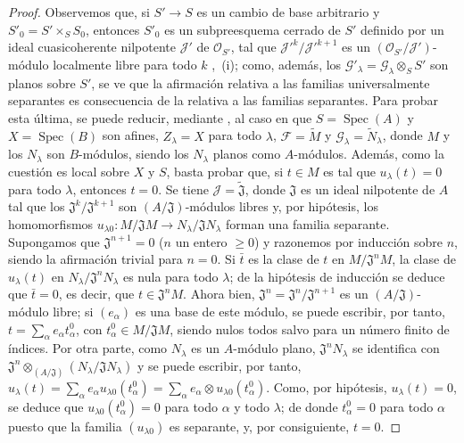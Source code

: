 \begin{proof}
Observemos que, si $S'\to S$ es un cambio de base arbitrario y $S'_0=S'\times_S S_0$, entonces $S'_0$ es un subpreesquema cerrado de $S'$ definido por un ideal cuasicoherente nilpotente $\mathcal J'$ de $\mathcal O_{S'}$, tal que $\mathcal J'^k/\mathcal J'^{k+1}$ es un $(\mathcal O_{S'}/\mathcal J')$-módulo localmente libre para todo $k$ ,~(i); como, además, los $\mathcal G'_\lambda=\mathcal G_\lambda\otimes_S S'$ son planos sobre $S'$, se ve que la afirmación relativa a las familias universalmente separantes es consecuencia de la relativa a las familias separantes.
Para probar esta última, se puede reducir, mediante , al caso en que $S=\operatorname{Spec}(A)$ y $X=\operatorname{Spec}(B)$ son afines, $Z_\lambda=X$ para todo $\lambda$, $\mathcal F=\widetilde M$ y $\mathcal G_\lambda=\widetilde N_\lambda$, donde $M$ y los $N_\lambda$ son $B$-módulos, siendo los $N_\lambda$ planos como $A$-módulos.
Además, como la cuestión es local sobre $X$ y $S$, basta probar que, si $t\in M$ es tal que $u_\lambda(t)=0$ para todo $\lambda$, entonces $t=0$.
Se tiene $\mathcal J=\widetilde{\mathfrak J}$, donde $\mathfrak J$ es un ideal nilpotente de $A$ tal que los $\mathfrak J^k/\mathfrak J^{k+1}$ son $(A/\mathfrak J)$-módulos libres y, por hipótesis, los homomorfismos $u_{\lambda0}:M/\mathfrak JM\to N_\lambda/\mathfrak JN_\lambda$ forman una familia separante.
Supongamos que $\mathfrak J^{n+1}=0$ ($n$ un entero $\geq0$) y razonemos por inducción sobre $n$, siendo la afirmación trivial para $n=0$.
Si $\bar t$ es la clase de $t$ en $M/\mathfrak J^nM$, la clase de $u_\lambda(t)$ en $N_\lambda/\mathfrak J^nN_\lambda$ es nula para todo $\lambda$; de la hipótesis de inducción se deduce que $\bar t=0$, es decir, que $t\in\mathfrak J^nM$.
Ahora bien, $\mathfrak J^n=\mathfrak J^n/\mathfrak J^{n+1}$ es un $(A/\mathfrak J)$-módulo libre; si $(e_\alpha)$ es una base de este módulo, se puede escribir, por tanto, $t=\sum_\alpha e_\alpha t^0_\alpha$, con $t^0_\alpha\in M/\mathfrak JM$, siendo nulos todos salvo para un número finito de índices.
Por otra parte, como $N_\lambda$ es un $A$-módulo plano, $\mathfrak J^nN_\lambda$ se identifica con
$\mathfrak J^n\otimes_{(A/\mathfrak J)}(N_\lambda/\mathfrak JN_\lambda)$ y se puede escribir, por tanto, $u_\lambda(t)=\sum_\alpha e_\alpha u_{\lambda0}(t^0_\alpha)
=\sum_\alpha e_\alpha\otimes u_{\lambda0}(t^0_\alpha)$.
Como, por hipótesis, $u_\lambda(t)=0$, se deduce que $u_{\lambda0}(t^0_\alpha)=0$ para todo $\alpha$ y todo $\lambda$; de donde $t^0_\alpha=0$ para todo $\alpha$ puesto que la familia $(u_{\lambda0})$ es separante, y, por consiguiente, $t=0$.
\end{proof}

